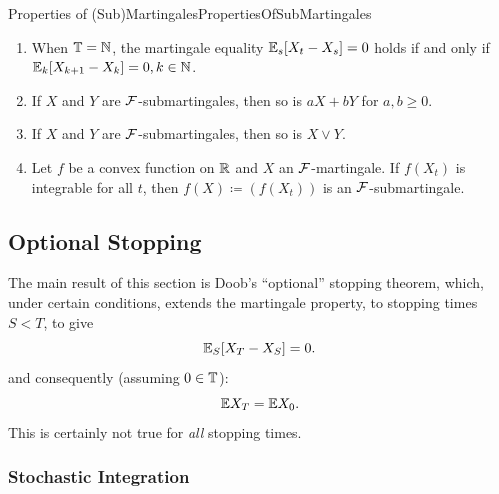 \begin{thm}{Properties of (Sub)Martingales}{PropertiesOfSubMartingales}
	\begin{enumerate}
		\item When $\mathbb{T} = \mathbb{N}$, the martingale equality $\mathbb{E}_s [X_t - X_s] = 0$ holds if and only if $\mathbb{E}_k [X_{k+1} - X_k] = 0, k \in \mathbb{N}$.
		\item If $X$ and $Y$ are $\mathcal{F}$-submartingales, then so is $aX + bY$ for $a, b \ge 0$.
		\item If $X$ and $Y$ are $\mathcal{F}$-submartingales, then so is $X \lor Y$.
		\item Let $f$ be a convex function on $\mathbb{R}$ and $X$ an $\mathcal{F}$-martingale. If $f(X_t)$ is integrable for all $t$, then $f(X) \coloneqq (f(X_t))$ is an $\mathcal{F}$-submartingale.
	\end{enumerate}
\end{thm}

\subsection{Optional Stopping}
The main result of this section is Doob’s “optional” stopping theorem, which, under certain conditions, extends the martingale property,  to stopping times $S < T$, to give
\begin{equation}\label{eq:DoobsOptionalStoppingEquality}
	\mathbb{E}_S[X_T - X_S] = 0.
\end{equation}
and consequently (assuming $0 \in \mathbb{T}$):
\begin{equation}\label{eq:OptionalStoppingExpectation}
	\mathbb{E} X_T = \mathbb{E} X_0.
\end{equation}
This is certainly not true for \textit{all} stopping times.
\subsubsection{Stochastic Integration}

